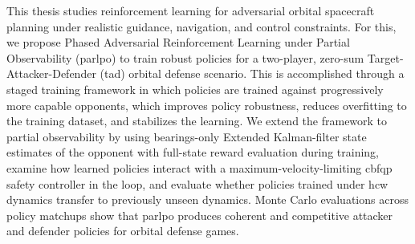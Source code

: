 This thesis studies reinforcement learning for adversarial orbital spacecraft planning under realistic guidance, navigation, and control constraints. For this, we propose Phased Adversarial Reinforcement Learning under Partial Observability (\acs{parlpo}) to train robust policies for a two-player, zero-sum Target-Attacker-Defender (\acs{tad}) orbital defense scenario. This is accomplished through a staged training framework in which policies are trained against progressively more capable opponents, which improves policy robustness, reduces overfitting to the training dataset, and stabilizes the learning. We extend the framework to partial observability by using bearings-only Extended Kalman-filter state estimates of the opponent with full-state reward evaluation during training, examine how learned policies interact with a maximum-velocity-limiting \acs{cbfqp} safety controller in the loop, and evaluate whether policies trained under \acs{hcw} dynamics transfer to previously unseen dynamics. Monte Carlo evaluations across policy matchups show that \acs{parlpo} produces coherent and competitive attacker and defender policies for orbital defense games.
